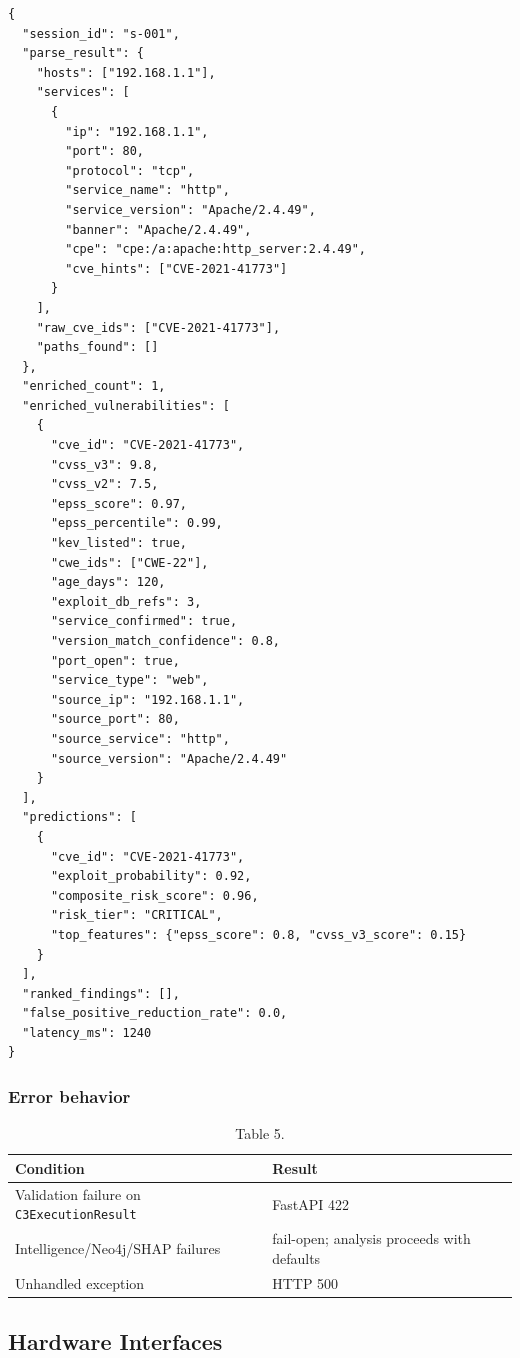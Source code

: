 \documentclass[10pt,journal,onecolumn]{IEEEtran}
\begin{document}
\begin{lstlisting}
{
  "session_id": "s-001",
  "parse_result": {
    "hosts": ["192.168.1.1"],
    "services": [
      {
        "ip": "192.168.1.1",
        "port": 80,
        "protocol": "tcp",
        "service_name": "http",
        "service_version": "Apache/2.4.49",
        "banner": "Apache/2.4.49",
        "cpe": "cpe:/a:apache:http_server:2.4.49",
        "cve_hints": ["CVE-2021-41773"]
      }
    ],
    "raw_cve_ids": ["CVE-2021-41773"],
    "paths_found": []
  },
  "enriched_count": 1,
  "enriched_vulnerabilities": [
    {
      "cve_id": "CVE-2021-41773",
      "cvss_v3": 9.8,
      "cvss_v2": 7.5,
      "epss_score": 0.97,
      "epss_percentile": 0.99,
      "kev_listed": true,
      "cwe_ids": ["CWE-22"],
      "age_days": 120,
      "exploit_db_refs": 3,
      "service_confirmed": true,
      "version_match_confidence": 0.8,
      "port_open": true,
      "service_type": "web",
      "source_ip": "192.168.1.1",
      "source_port": 80,
      "source_service": "http",
      "source_version": "Apache/2.4.49"
    }
  ],
  "predictions": [
    {
      "cve_id": "CVE-2021-41773",
      "exploit_probability": 0.92,
      "composite_risk_score": 0.96,
      "risk_tier": "CRITICAL",
      "top_features": {"epss_score": 0.8, "cvss_v3_score": 0.15}
    }
  ],
  "ranked_findings": [],
  "false_positive_reduction_rate": 0.0,
  "latency_ms": 1240
}
\end{lstlisting}

\subsubsection{Error behavior}

\begin{table}[h]
\caption{Table 5.}
\label{tab:t5}
\begin{tabularx}{\columnwidth}{l >{\raggedright\arraybackslash}X}
\toprule
\textbf{Condition} & \textbf{Result}\\
\midrule
Validation failure on \texttt{C3ExecutionResult} & FastAPI 422\\
Intelligence/Neo4j/SHAP failures & fail-open; analysis proceeds with defaults\\
Unhandled exception & HTTP 500\\
\bottomrule
\end{tabularx}
\end{table}

\subsection{Hardware Interfaces}
\end{document}
